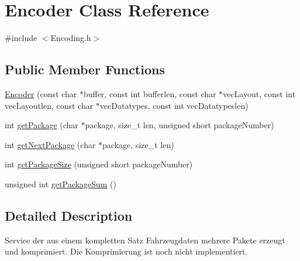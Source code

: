 \hypertarget{classEncoder}{\section{Encoder Class Reference}
\label{classEncoder}
}


{\ttfamily \#include $<$Encoding.\-h$>$}

\subsection*{Public Member Functions}
\begin{DoxyCompactItemize}
\item 
\hyperlink{classEncoder_ac957151409a5f04f3d3065d730decbed}{Encoder} (const char $\ast$buffer, const int bufferlen, const char $\ast$vec\-Layout, const int vec\-Layoutlen, const char $\ast$vec\-Datatypes, const int vec\-Datatypeslen)
\item 
int \hyperlink{classEncoder_a311f7e2d81ee27cf1c73c62bad1c046b}{get\-Package} (char $\ast$package, size\-\_\-t len, unsigned short package\-Number)
\item 
int \hyperlink{classEncoder_aebc183e41020b51fbbd054ecc448e83b}{get\-Next\-Package} (char $\ast$package, size\-\_\-t len)
\item 
int \hyperlink{classEncoder_ac2567f8f3c63f486f82758b4da51b660}{get\-Package\-Size} (unsigned short package\-Number)
\item 
unsigned int \hyperlink{classEncoder_a32406ccfc04e12f876f07be50c5b2c6b}{get\-Package\-Sum} ()
\end{DoxyCompactItemize}


\subsection{Detailed Description}
Service der aus einem kompletten Satz Fahrzeugdaten mehrere Pakete erzeugt und komprimiert. Die Komprimierung ist noch nicht implementiert. 

